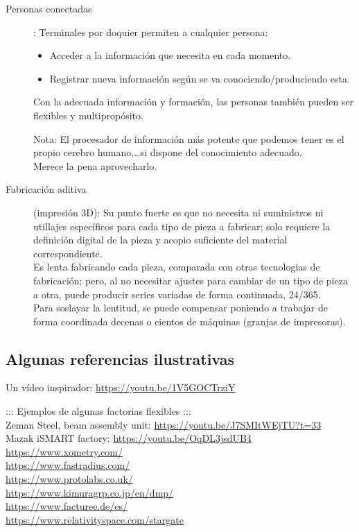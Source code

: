 \documentclass[spanish,12pt,a4paper,final,oneside]{book}
\begin{document}
\begin{description}
\item[Personas conectadas]: Terminales por doquier permiten a cualquier persona:
\begin{itemize}
\item Acceder a la información que necesita en cada momento.
\item Registrar nueva información según se va conociendo/produciendo esta.
\end{itemize} 
Con la adecuada información y formación, las personas también pueden ser flexibles y multipropósito.

Nota: El procesador de información más potente que podemos tener es el propio cerebro humano,\ldots si dispone del conocimiento adecuado.
\\Merece la pena aprovecharlo.

\item[Fabricación aditiva] (impresión 3D): Su punto fuerte es que no necesita ni suministros ni utillajes específicos para cada tipo de pieza a fabricar; solo requiere la definición digital de la pieza y acopio suficiente del material correspondiente. 
\\Es lenta fabricando cada pieza, comparada con otras tecnologias de fabricación; pero, al no necesitar ajustes para cambiar de un tipo de pieza a otra, puede producir series variadas de forma continuada, 24/365.
\\Para soslayar la lentitud, se puede compensar poniendo a trabajar de forma coordinada decenas o cientos de máquinas (granjas de impresoras).
\end{description}

\subsection*{Algunas referencias ilustrativas}
Un vídeo inspirador: \url{https://youtu.be/1V5GOCTrziY}

::: Ejemplos de algunas factorias flexibles :::
\\ Zeman Steel, beam assembly unit: \url{https://youtu.be/J7SMItWEjTU?t=33}
\\ Mazak iSMART factory: \url{https://youtu.be/OqDL3jsdUB4}
\\ \url{https://www.xometry.com/}
\\ \url{https://www.fastradius.com/}
\\ \url{https://www.protolabs.co.uk/}
\\ \url{https://www.kimuragrp.co.jp/en/dmp/}
\\ \url{https://www.facturee.de/es/}
\\ \url{https://www.relativityspace.com/stargate}
\end{document}
